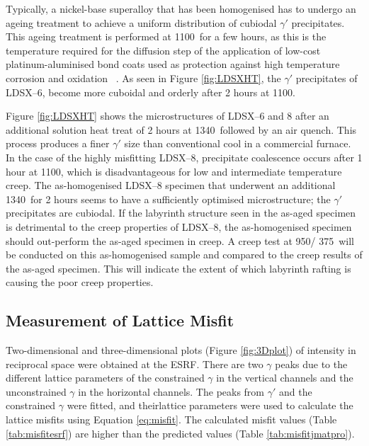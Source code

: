 \vspace{-8mm}
%
Typically, a nickel-base superalloy that has been homogenised has to undergo an ageing treatment to achieve a uniform distribution of cubiodal $\gamma'$ precipitates.  This ageing treatment is performed at 1100\celsius\ for a few hours, as this is the temperature required for the diffusion step of the application of low-cost platinum-aluminised bond coats used as protection against high temperature corrosion and oxidation ~\cite{reed06}.  As seen in Figure \ref{fig:LDSXHT}, the $\gamma'$ precipitates of LDSX--6, become more cuboidal and orderly after 2 hours at 1100\celsius .  

Figure \ref{fig:LDSXHT} shows the microstructures of LDSX--6 and 8 after an additional solution heat treat of 2 hours at 1340\celsius\ followed by an air quench.  This process produces a finer $\gamma'$ size than conventional cool in a commercial furnace.  In the case of the highly misfitting LDSX--8, precipitate coalescence occurs after 1 hour at 1100\celsius, which is disadvantageous for low and intermediate temperature creep.  The as-homogenised LDSX--8 specimen that underwent an additional 1340\celsius\ for 2 hours seems to have a sufficiently optimised microstructure; the $\gamma'$ precipitates are cubiodal.  If the labyrinth structure seen in the as-aged specimen is detrimental to the creep properties of LDSX--8, the as-homogenised specimen should out-perform the as-aged specimen in creep.  A creep test at 950\celsius/ 375\mega\pascal\ will be conducted on this as-homogenised sample and compared to the creep results of the as-aged specimen.  This will indicate the extent of which labyrinth rafting is causing the poor creep properties.

\subsection{Measurement of Lattice Misfit}

Two-dimensional and three-dimensional plots (Figure \ref{fig:3Dplot}) of intensity in reciprocal space were obtained at the ESRF. There are two $\gamma$ peaks due to the different lattice parameters of the constrained $\gamma$ in the vertical channels and the unconstrained $\gamma$ in the horizontal channels. The peaks from $\gamma'$ and the constrained $\gamma$ were fitted, and theirlattice parameters were used to calculate the lattice misfits using Equation \eqref{eq:misfit}. The calculated misfit values (Table \ref{tab:misfitesrf}) are higher than the predicted values (Table \ref{tab:misfitjmatpro}). 
 
